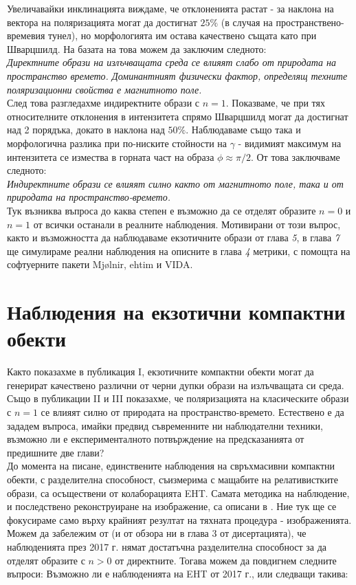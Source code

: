 \documentclass[12pt]{article}
\numberwithin{equation}{section}
\numberwithin{figure}{section}
\begin{document}
	Увеличавайки инклинацията виждаме, че отклоненията растат - за наклона на вектора на поляризацията могат да достигнат $25\%$ (в случая на пространствено-времевия тунел), но морфологията им остава качествено същата като при Шварцшилд. На базата на това можем да заключим следното:\\
	
	\emph{Директните образи на излъчващата среда се влияят слабо от природата на пространство времето. Доминантният физически фактор, определящ техните поляризационни свойства е магнитното поле.}\\
	
	След това разгледахме индиректните образи с $n = 1$. Показваме, че при тях относителните отклонения в интензитета спрямо Шварцшилд могат да достигнат над 2 порядъка, докато в наклона над $50\%$. Наблюдаваме също така и морфологична разлика при по-ниските стойности на $\gamma$ - видимият максимум на интензитета се измества в горната част на образа $\phi\approx\pi / 2$. От това заключваме следното:\\
	
	\emph{Индиректните образи се влияят силно както от магнитното поле, така и от природата на пространство-времето.}\\

	Тук възниква въпроса до каква степен е възможно да се отделят образите $n = 0$ и $n = 1$ от всички останали в реалните наблюдения. Мотивирани от този въпрос, както и възможността да наблюдаваме екзотичните образи от глава \emph{5}, в глава \emph{7} ще симулираме реални наблюдения на описните в глава \emph{4} метрики, с помощта на софтуерните пакети Mjølnir, ehtim и VIDA.
	
	\section{Наблюдения на екзотични компактни обекти}
	
	Както показахме в публикация I, екзотичните компактни обекти могат да генерират качествено различни от черни дупки образи на излъчващата си среда. Също в публикации II и III показахме, че поляризацията на класическите образи с $n = 1$ се влияят силно от природата на пространство-времето. Естествено е да зададем въпроса, имайки предвид съвременните ни наблюдателни техники, възможно ли е експерименталното потвърждение на предсказанията от предишните две глави?\\
	
	До момента на писане, единствените наблюдения на свръхмасивни компактни обекти, с разделителна способност, съизмерима с мащабите на релативистките образи, са осъществени от колаборацията EHT. Самата методика на наблюдение, и последствено реконструиране на изображение, са описани в \cite{EHT_M87_II}\cite{EHT_M87_III}. Ние тук ще се фокусираме само върху крайният резултат на тяхната процедура - изображенията. Можем да забележим от \cite{EHT_M87_I}\cite{EHT_SGR_I} (и от обзора ни в глава 3 от дисертацията), че наблюденията през 2017 г. нямат достатъчна разделителна способност за да отделят образите с $n > 0 $ от директните. Тогава можем да повдигнем следните въпроси: Възможно ли е наблюденията на EHT от 2017 г., или следващи такива:\\
	
\end{document}
